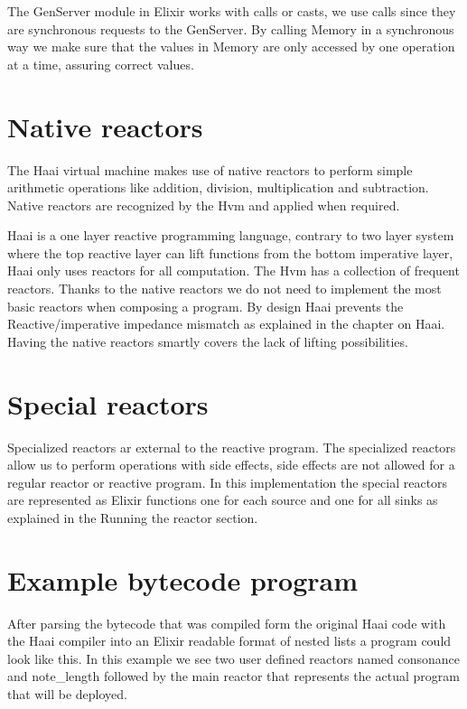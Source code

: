 \documentclass[a4paper]{book}
\begin{document}
The GenServer module in Elixir works with calls or casts, we use calls since they are synchronous requests to the GenServer. By calling Memory in a synchronous way we make sure that the values in Memory are only accessed by one operation at a time, assuring correct values. 

\section{Native reactors}
The Haai virtual machine makes use of native reactors to perform simple arithmetic operations like addition, division, multiplication and subtraction. Native reactors are recognized by the Hvm and applied when required.

Haai is a one layer reactive programming language, contrary to two layer system where the top reactive layer can lift functions from the bottom imperative layer, Haai only uses reactors for all computation. The Hvm has a collection of frequent reactors. Thanks to the native reactors we do not need to implement the most basic reactors when composing a program. By design Haai prevents the Reactive/imperative impedance mismatch as explained in the chapter on Haai. Having the native reactors smartly covers the lack of lifting possibilities.

\section{Special reactors}
Specialized reactors ar external to the reactive program. The specialized reactors allow us to perform operations with side effects, side effects are not allowed for a regular reactor or reactive program.
In this implementation the special reactors are represented as Elixir functions one for each source and one for all sinks as explained in the Running the reactor section.

\section{Example bytecode program}

After parsing the bytecode that was compiled form the original Haai code with the Haai compiler into an Elixir readable format of nested lists a program could look like this. In this example we see two user defined reactors named consonance and note\_length followed by the main reactor that represents the actual program that will be deployed. 
\end{document}
